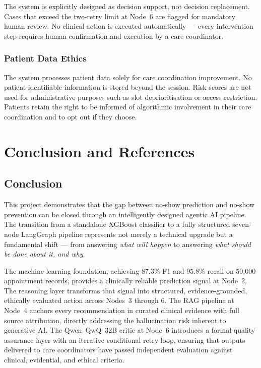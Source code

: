 \documentclass[12pt, a4paper]{report}
\begin{document}
The system is explicitly designed as decision support, not decision replacement. Cases that exceed the two-retry limit at Node~6 are flagged for mandatory human review. No clinical action is executed automatically --- every intervention step requires human confirmation and execution by a care coordinator.

\subsection{Patient Data Ethics}

The system processes patient data solely for care coordination improvement. No patient-identifiable information is stored beyond the session. Risk scores are not used for administrative purposes such as slot deprioritisation or access restriction. Patients retain the right to be informed of algorithmic involvement in their care coordination and to opt out if they choose.

\chapter{Conclusion and References}

\section{Conclusion}

This project demonstrates that the gap between no-show prediction and no-show prevention can be closed through an intelligently designed agentic AI pipeline. The transition from a standalone XGBoost classifier to a fully structured seven-node LangGraph pipeline represents not merely a technical upgrade but a fundamental shift --- from answering \textit{what will happen} to answering \textit{what should be done about it, and why}.

The machine learning foundation, achieving 87.3\% F1 and 95.8\% recall on 50,000 appointment records, provides a clinically reliable prediction signal at Node~2. The reasoning layer transforms that signal into structured, evidence-grounded, ethically evaluated action across Nodes~3 through 6. The RAG pipeline at Node~4 anchors every recommendation in curated clinical evidence with full source attribution, directly addressing the hallucination risk inherent to generative AI. The Qwen~QwQ~32B critic at Node~6 introduces a formal quality assurance layer with an iterative conditional retry loop, ensuring that outputs delivered to care coordinators have passed independent evaluation against clinical, evidential, and ethical criteria.
\end{document}
